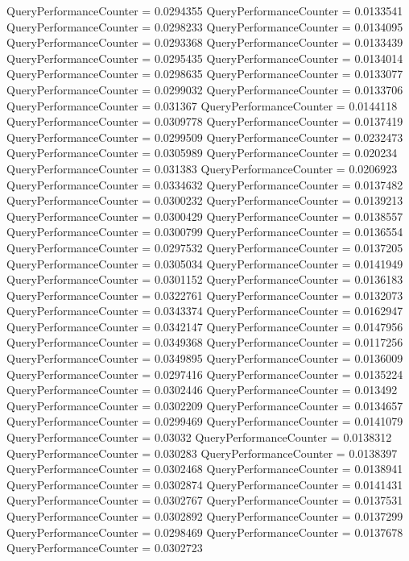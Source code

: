 \documentclass[9pt]{article}
\theoremstyle{plain}
\theoremstyle{definition}
\theoremstyle{remark}
\numberwithin{equation}{section}
\begin{document}
QueryPerformanceCounter  =  0.0294355
QueryPerformanceCounter  =  0.0133541
QueryPerformanceCounter  =  0.0298233
QueryPerformanceCounter  =  0.0134095
QueryPerformanceCounter  =  0.0293368
QueryPerformanceCounter  =  0.0133439
QueryPerformanceCounter  =  0.0295435
QueryPerformanceCounter  =  0.0134014
QueryPerformanceCounter  =  0.0298635
QueryPerformanceCounter  =  0.0133077
QueryPerformanceCounter  =  0.0299032
QueryPerformanceCounter  =  0.0133706
QueryPerformanceCounter  =  0.031367
QueryPerformanceCounter  =  0.0144118
QueryPerformanceCounter  =  0.0309778
QueryPerformanceCounter  =  0.0137419
QueryPerformanceCounter  =  0.0299509
QueryPerformanceCounter  =  0.0232473
QueryPerformanceCounter  =  0.0305989
QueryPerformanceCounter  =  0.020234
QueryPerformanceCounter  =  0.031383
QueryPerformanceCounter  =  0.0206923
QueryPerformanceCounter  =  0.0334632
QueryPerformanceCounter  =  0.0137482
QueryPerformanceCounter  =  0.0300232
QueryPerformanceCounter  =  0.0139213
QueryPerformanceCounter  =  0.0300429
QueryPerformanceCounter  =  0.0138557
QueryPerformanceCounter  =  0.0300799
QueryPerformanceCounter  =  0.0136554
QueryPerformanceCounter  =  0.0297532
QueryPerformanceCounter  =  0.0137205
QueryPerformanceCounter  =  0.0305034
QueryPerformanceCounter  =  0.0141949
QueryPerformanceCounter  =  0.0301152
QueryPerformanceCounter  =  0.0136183
QueryPerformanceCounter  =  0.0322761
QueryPerformanceCounter  =  0.0132073
QueryPerformanceCounter  =  0.0343374
QueryPerformanceCounter  =  0.0162947
QueryPerformanceCounter  =  0.0342147
QueryPerformanceCounter  =  0.0147956
QueryPerformanceCounter  =  0.0349368
QueryPerformanceCounter  =  0.0117256
QueryPerformanceCounter  =  0.0349895
QueryPerformanceCounter  =  0.0136009
QueryPerformanceCounter  =  0.0297416
QueryPerformanceCounter  =  0.0135224
QueryPerformanceCounter  =  0.0302446
QueryPerformanceCounter  =  0.013492
QueryPerformanceCounter  =  0.0302209
QueryPerformanceCounter  =  0.0134657
QueryPerformanceCounter  =  0.0299469
QueryPerformanceCounter  =  0.0141079
QueryPerformanceCounter  =  0.03032
QueryPerformanceCounter  =  0.0138312
QueryPerformanceCounter  =  0.030283
QueryPerformanceCounter  =  0.0138397
QueryPerformanceCounter  =  0.0302468
QueryPerformanceCounter  =  0.0138941
QueryPerformanceCounter  =  0.0302874
QueryPerformanceCounter  =  0.0141431
QueryPerformanceCounter  =  0.0302767
QueryPerformanceCounter  =  0.0137531
QueryPerformanceCounter  =  0.0302892
QueryPerformanceCounter  =  0.0137299
QueryPerformanceCounter  =  0.0298469
QueryPerformanceCounter  =  0.0137678
QueryPerformanceCounter  =  0.0302723
\end{document}
